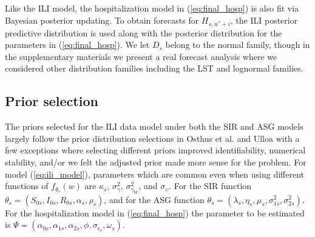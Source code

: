 Like the ILI model, the hospitalization model in (\ref{eq:final_hosp}) is also 
fit via Bayesian posterior updating. To obtain forecasts for $H_{s, w^* + i}$, 
the ILI posterior predictive distribution is used along with the posterior 
distribution for the parameters in (\ref{eq:final_hosp}). 
We let $D_s$ belong to the normal family, though in the supplementary materials
we present a real forecast
analysis where we considered other distribution families
including the LST and lognormal families.



\subsection{Prior selection}


The priors selected for the ILI data model under both the SIR and ASG models 
largely follow the prior distribution 
selections in Osthus et al. \cite[]{osthus2019dynamic} 
and Ulloa \cite[]{ulloa2019} with a few exceptions where selecting
different priors improved 
identifiability, 
numerical stability, and/or we felt the adjusted prior made more sense for the 
problem. For model (\ref{eq:ili_model}), parameters which are common even when 
using different functions of $f_{\theta_s}(w)$ are $\kappa_s$, 
$\sigma_{\gamma}^2$, $\sigma_{\gamma_W}^2$, and $\sigma_{\upsilon}$. For the SIR function 
$\theta_s = (S_{0s}, I_{0s}, R_{0s}, \alpha_s, \rho_s)$, and for the ASG 
function $\theta_s = (\lambda_s, \eta_s, \mu_s, \sigma_{1s}^2, \sigma_{2s}^2)$. 
For the hospitalization model in (\ref{eq:final_hosp}) the parameter to be 
estimated is $\Psi = (\alpha_{0s}, \alpha_{1s}, \alpha_{2s}, \phi, \sigma_{\epsilon_s}, \omega_s)$. 


